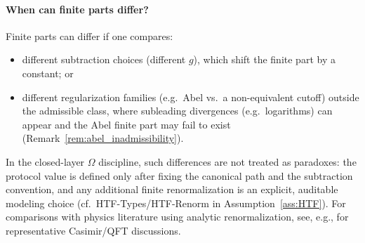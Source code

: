 \paragraph{When can finite parts differ?}
Finite parts can differ if one compares:
\begin{itemize}
\item different subtraction choices (different $g$), which shift the finite part by a constant; or
\item different regularization families (e.g.\ Abel vs.\ a non-equivalent cutoff) outside the admissible class, where subleading divergences (e.g.\ logarithms) can appear and the Abel finite part may fail to exist (Remark~\ref{rem:abel_inadmissibility}).
\end{itemize}
In the closed-layer $\Omega$ discipline, such differences are not treated as paradoxes: the protocol value is defined only after fixing the canonical path and the subtraction convention, and any additional finite renormalization is an explicit, auditable modeling choice (cf.\ HTF-Types/HTF-Renorm in Assumption~\ref{ass:HTF}).
For comparisons with physics literature using analytic renormalization, see, e.g., \cite{arXiv1104.4330} for representative Casimir/QFT discussions.


